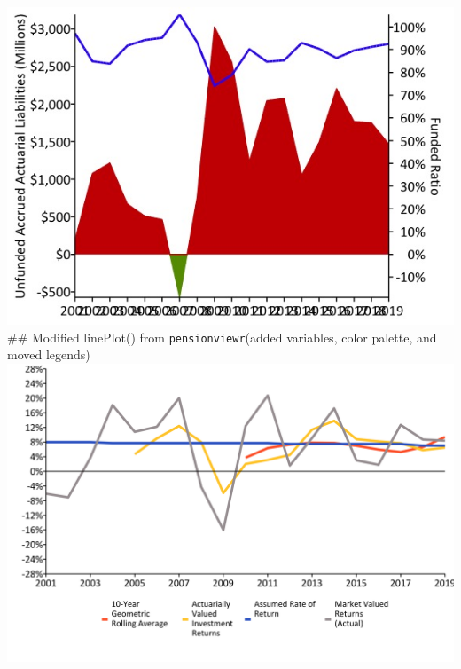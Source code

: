 \documentclass[
]{article}
\begin{document}
\includegraphics{graphs/DebtPlot.Orig.jpeg} \#\# Modified linePlot()
from \texttt{pensionviewr}(added variables, color palette, and moved
legends) \includegraphics{graphs/Inv.Returns.PERSI.png}
\end{document}
